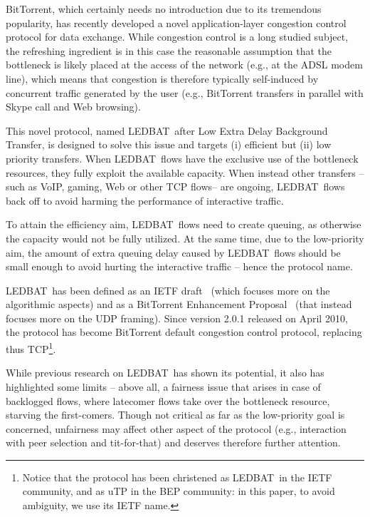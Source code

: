 \documentclass[conference]{IEEEtran}
\newcommand{\btledbat}[0]{LEDBAT}
\begin{document}
BitTorrent, which certainly needs no introduction due to its tremendous popularity, has recently developed a novel application-layer congestion control  protocol for data exchange. While congestion control is a long studied subject, the refreshing ingredient is in this case the reasonable assumption that the bottleneck is likely placed at the access of the network (e.g., at the ADSL modem line), which means that congestion is therefore typically self-induced by concurrent traffic generated by the user (e.g., BitTorrent transfers in parallel with Skype call and Web browsing).

This novel protocol, named \btledbat\ after Low Extra Delay Background Transfer, is designed to solve this issue and targets (i) efficient but (ii) low priority transfers. When \btledbat\ flows have the exclusive use of the bottleneck resources, they fully exploit the available capacity. When instead other transfers --such as VoIP, gaming, Web or other TCP flows-- are ongoing, \btledbat\ flows back off to avoid harming the performance of interactive traffic.

To attain the efficiency aim, \btledbat\ flows need to create queuing, as otherwise the capacity would not be fully utilized. At the same time, due to the low-priority aim, the amount of extra queuing delay caused by \btledbat\ flows should be small enough to avoid hurting the interactive traffic -- hence the protocol name.

 \btledbat\ has been defined as an IETF draft~\cite{ledbat_draft} (which focuses more on the algorithmic aspects) and as a BitTorrent Enhancement Proposal~\cite{bep29} (that instead focuses more on the UDP framing).
 Since version 2.0.1 released on April 2010, the protocol has become BitTorrent default congestion control protocol, replacing thus TCP\footnote{Notice that the protocol has been christened as \btledbat\ in the IETF community, and as uTP in the BEP community: in this paper, to avoid ambiguity, we use its IETF name.}.


While previous research\cite{pam10,icccn10,globecom10,lcn10,gordon2010iccnt,cohen10iptps} on \btledbat\ has shown its potential, it also has highlighted some limits -- above all, a fairness issue that arises in case of backlogged flows, where latecomer flows take over the bottleneck resource, starving the first-comers. Though not critical as far as the low-priority goal is concerned, unfairness may affect other aspect of the protocol (e.g., interaction with peer selection and tit-for-that) and deserves therefore further attention.
\end{document}
